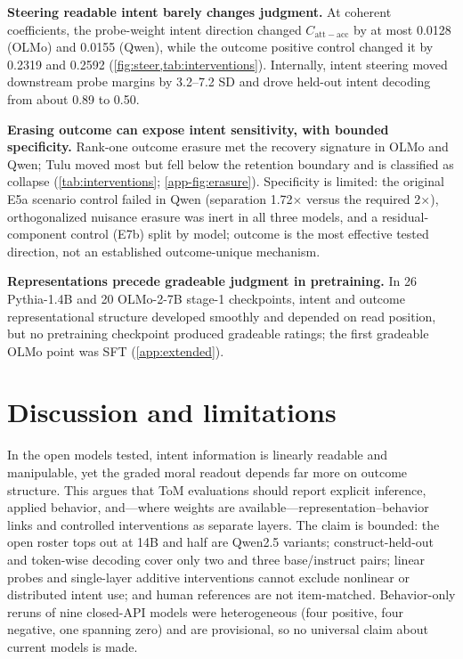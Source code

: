 \documentclass{article}
\newcommand{\contrast}{C_{\mathrm{att-acc}}}
\begin{document}
\textbf{Steering readable intent barely changes judgment.}
At coherent coefficients, the probe-weight intent direction changed $\contrast$ by at most 0.0128 (OLMo) and 0.0155 (Qwen), while the outcome positive control changed it by 0.2319 and 0.2592 (\cref{fig:steer,tab:interventions}).
Internally, intent steering moved downstream probe margins by 3.2--7.2 SD and drove held-out intent decoding from about 0.89 to 0.50.


\textbf{Erasing outcome can expose intent sensitivity, with bounded specificity.}
Rank-one outcome erasure met the recovery signature in OLMo and Qwen; Tulu moved most but fell below the retention boundary and is classified as collapse (\cref{tab:interventions}; \cref{app-fig:erasure}).
Specificity is limited: the original E5a scenario control failed in Qwen (separation 1.72$\times$ versus the required 2$\times$), orthogonalized nuisance erasure was inert in all three models, and a residual-component control (E7b) split by model; outcome is the most effective tested direction, not an established outcome-unique mechanism.

\textbf{Representations precede gradeable judgment in pretraining.}
In 26 Pythia-1.4B and 20 OLMo-2-7B stage-1 checkpoints, intent and outcome representational structure developed smoothly and depended on read position, but no pretraining checkpoint produced gradeable ratings; the first gradeable OLMo point was SFT (\cref{app:extended}).

\section{Discussion and limitations}

In the open models tested, intent information is linearly readable and manipulable, yet the graded moral readout depends far more on outcome structure.
This argues that ToM evaluations should report explicit inference, applied behavior, and---where weights are available---representation--behavior links and controlled interventions as separate layers.
The claim is bounded: the open roster tops out at 14B and half are Qwen2.5 variants; construct-held-out and token-wise decoding cover only two and three base/instruct pairs; linear probes and single-layer additive interventions cannot exclude nonlinear or distributed intent use; and human references are not item-matched.
Behavior-only reruns of nine closed-API models were heterogeneous (four positive, four negative, one spanning zero) and are provisional, so no universal claim about current models is made.
\end{document}
